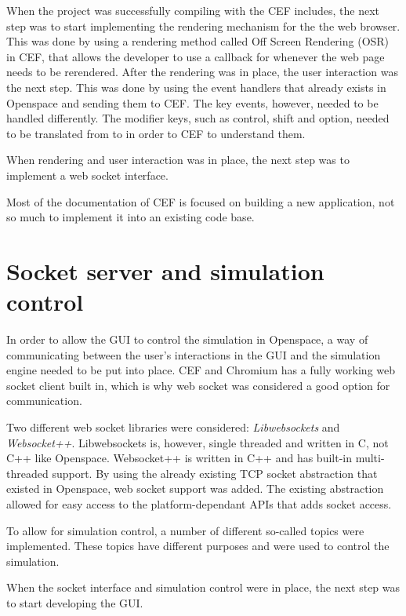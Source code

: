 When the project was successfully compiling with the CEF includes, the next step was to start implementing the rendering mechanism for the the web browser. This was done by using a rendering method called Off Screen Rendering (OSR) in CEF, that allows the developer to use a callback for whenever the web page needs to be rerendered. After the rendering was in place, the user interaction was the next step. This was done by using the event handlers that already exists in Openspace and sending them to CEF. The key events, however, needed to be handled differently. The modifier keys, such as control, shift and option, needed to be translated from  to  in order to CEF to understand them.

When rendering and user interaction was in place, the next step was to implement a web socket interface.

Most of the documentation of CEF is focused on building a new application, not so much to implement it into an existing code base. 

\section{Socket server and simulation control}

In order to allow the GUI to control the simulation in Openspace, a way of communicating between the user's interactions in the GUI and the simulation engine needed to be put into place. CEF and Chromium has a fully working web socket client built in, which is why web socket was considered a good option for communication.

Two different web socket libraries were considered: \emph{Libwebsockets} and \emph{Websocket++}. Libwebsockets is, however, single threaded and written in C, not C++ like Openspace. \cite{lwssingle} Websocket++ is written in C++ and has built-in multi-threaded support. By using the already existing TCP socket abstraction that existed in Openspace, web socket support was added. The existing abstraction allowed for easy access to the platform-dependant APIs that adds socket access.

To allow for simulation control, a number of different so-called topics were implemented. These topics have different purposes and were used to control the simulation.

When the socket interface and simulation control were in place, the next step was to start developing the GUI.

